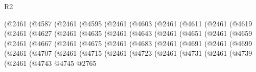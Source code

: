 \begin{lexlean}{R2}
\begin{coremodule}
          (@2461
            (@4587
              (@2461
                (@4595
                  (@2461
                    (@4603
                      (@2461
                        (@4611
                          (@2461
                            (@4619
                              (@2461
                                (@4627
                                  (@2461
                                    (@4635
                                      (@2461
                                        (@4643
                                          (@2461
                                            (@4651
                                              (@2461
                                                (@4659
                                                  (@2461
                                                    (@4667
                                                      (@2461
                                                        (@4675
                                                          (@2461
                                                            (@4683
                                                              (@2461
                                                                (@4691
                                                                  (@2461
                                                                    (@4699
                                                                      (@2461
                                                                        (@4707
                                                                          (@2461
                                                                            (@4715
                                                                              (@2461
                                                                                (@4723
                                                                                  (@2461
                                                                                    (@4731
                                                                                      (@2461
                                                                                        (@4739
                                                                                          (@2461
                                                                                            (@4743
                                                                                              @4745
                                                                                              @2765

\end{coremodule}
\end{lexlean}

